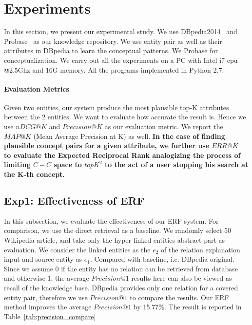 
\section{Experiments}
\label{sec:exp}

In this section, we present our experimental study.
We use DBpedia2014~\cite{dbpedia} and Probase~\cite{wu2012probase} as our knowledge repository.
We use entity pair as well as their attributes in DBpedia to learn the conceptual patterns.
We Probase for conceptualization. We carry out all the experiments on a PC with Intel i7 cpu @2.5Ghz and 16G memory.
All the programs implemented in Python 2.7.

\paragraph*{Evaluation Metrics}
Given two entities, our system produce the most plausible top-K attributes between the 2 entities.
We want to evaluate how accurate the result is. Hence we use $nDCG@K$ and $Precision@K$ as our evaluation metric.
We report the $MAP@K$ (Mean Average Precision at K) as well.
{\bf  In the case of finding plausible concept pairs for a given attribute, we further use $ ERR@K$~\cite{chapelle2009expected} to evaluate the Expected Reciprocal Rank analogizing the process of limiting $C-C$ space to $topK^2$ to the act of a user stopping his search at the K-th concept.
}


\subsection{Exp1: Effectiveness of ERF}
In this subsection, we evaluate the effectiveness of our ERF system.
For comparison, we use the direct retrieval as a baseline.
We randomly select 50 Wikipedia article, and take only the hyper-linked entities abstract part as evaluation.
We consider the linked entities as the $e_2$ of the relation explanation input and source entity as $e_1$.
Compared with baseline, i.e. DBpedia original.
Since we assume 0 if the entity has no relation can be retrieved from database and otherwise 1, the average $Precision@1$ results here can also be viewed as \ac{recall} of the knowledge base.
DBpedia provides only one relation for a covered entity pair, therefore we use $Precision@1$ to compare the results.
Our ERF method improves the average $Precision@1$ by 15.77\%.
The result is reported in Table~\ref{tab:precision_compare}

